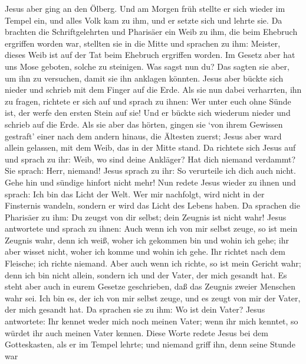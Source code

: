  Jesus aber ging an den Ölberg.  Und am
Morgen früh stellte er sich wieder im Tempel ein, und alles Volk kam zu
ihm, und er setzte sich und lehrte sie.  Da brachten die
Schriftgelehrten und Pharisäer ein Weib zu ihm, die beim Ehebruch
ergriffen worden war, stellten sie in die Mitte  und
sprachen zu ihm: Meister, dieses Weib ist auf der Tat beim Ehebruch
ergriffen worden.  Im Gesetz aber hat uns Mose geboten,
solche zu steinigen. Was sagst nun du?  Das sagten sie
aber, um ihn zu versuchen, damit sie ihn anklagen könnten. Jesus aber
bückte sich nieder und schrieb mit dem Finger auf die Erde.
 Als sie nun dabei verharrten, ihn zu fragen, richtete er
sich auf und sprach zu ihnen: Wer unter euch ohne Sünde ist, der werfe
den ersten Stein auf sie!  Und er bückte sich wiederum
nieder und schrieb auf die Erde.  Als sie aber das hörten,
gingen sie `von ihrem Gewissen gestraft' einer nach dem andern hinaus,
die Ältesten zuerst; Jesus aber ward allein gelassen, mit dem Weib, das
in der Mitte stand.  Da richtete sich Jesus auf und
sprach zu ihr: Weib, wo sind deine Ankläger? Hat dich niemand verdammt?
 Sie sprach: Herr, niemand! Jesus sprach zu ihr: So
verurteile ich dich auch nicht. Gehe hin und sündige hinfort nicht mehr!
 Nun redete Jesus wieder zu ihnen und sprach: Ich bin das
Licht der Welt. Wer mir nachfolgt, wird nicht in der Finsternis wandeln,
sondern er wird das Licht des Lebens haben.  Da sprachen
die Pharisäer zu ihm: Du zeugst von dir selbst; dein Zeugnis ist nicht
wahr!  Jesus antwortete und sprach zu ihnen: Auch wenn
ich von mir selbst zeuge, so ist mein Zeugnis wahr, denn ich weiß, woher
ich gekommen bin und wohin ich gehe; ihr aber wisset nicht, woher ich
komme und wohin ich gehe.  Ihr richtet nach dem Fleische;
ich richte niemand.  Aber auch wenn ich richte, so ist
mein Gericht wahr; denn ich bin nicht allein, sondern ich und der Vater,
der mich gesandt hat.  Es steht aber auch in eurem
Gesetze geschrieben, daß das Zeugnis zweier Menschen wahr sei.
 Ich bin es, der ich von mir selbst zeuge, und es zeugt
von mir der Vater, der mich gesandt hat.  Da sprachen sie
zu ihm: Wo ist dein Vater? Jesus antwortete: Ihr kennet weder mich noch
meinen Vater; wenn ihr mich kenntet, so würdet ihr auch meinen Vater
kennen.  Diese Worte redete Jesus bei dem Gotteskasten,
als er im Tempel lehrte; und niemand griff ihn, denn seine Stunde war
